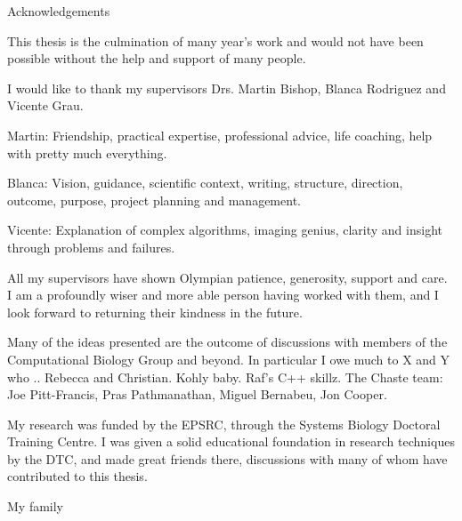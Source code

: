\vspace*{20mm}
{
\Large\bf
\begin{center}
Acknowledgements
\end{center}
}

This thesis is the culmination of many year's work and would not have
been possible without the help and support of many
people. 

I would like to thank my supervisors Drs. Martin Bishop, Blanca Rodriguez and Vicente Grau. 

Martin:
Friendship, practical expertise, professional advice, life coaching, help with pretty much everything.

Blanca:
Vision, guidance, scientific context, writing, structure, direction, outcome, purpose, project planning and management.

Vicente:
Explanation of complex algorithms, imaging genius, clarity and insight through problems and failures.

All my supervisors have shown Olympian patience, generosity, support and care. I am a profoundly wiser and more able person having worked with them, and I look forward to returning their kindness in the future.

Many of the ideas presented are the outcome of discussions
with members of the Computational Biology Group and beyond. In particular I owe
much to X and Y who ..
Rebecca and Christian.
Kohly baby.
Raf's C++ skillz.
The Chaste team: Joe Pitt-Francis, Pras Pathmanathan, Miguel Bernabeu, Jon Cooper.

My research was funded by the EPSRC, through the Systems Biology Doctoral Training Centre. I was given a solid educational foundation in research techniques by the DTC, and made great friends there, discussions with many of whom have contributed to this thesis.

My family
